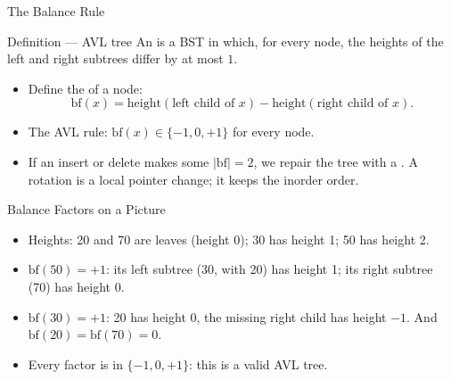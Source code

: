 \documentclass[aspectratio=169]{beamer}
\begin{document}
\begin{frame}{The Balance Rule}
  \begin{block}{Definition --- AVL tree}
    An  is a BST in which, for every node, the heights of the
    left and right subtrees differ by at most $1$.
  \end{block}
  \begin{itemize}
    \item Define the  of a node:
      \[
        \mathrm{bf}(x) = \mathrm{height}(\text{left child of }x)
                       - \mathrm{height}(\text{right child of }x).
      \]
    \item The AVL rule: $\mathrm{bf}(x) \in \{-1,0,+1\}$ for every node.
    \item If an insert or delete makes some $|\mathrm{bf}| = 2$, we repair
      the tree with a . A rotation is a local pointer change;
      it keeps the inorder order.
  \end{itemize}
\end{frame}

\begin{frame}{Balance Factors on a Picture}
  \begin{center}
  \end{center}
  \vspace{-0.1cm}
  \begin{itemize}
    \item Heights: 20 and 70 are leaves (height 0); 30 has height 1;
      50 has height 2.
    \item $\mathrm{bf}(50)=+1$: its left subtree (30, with 20) has height
      1; its right subtree (70) has height 0.
    \item $\mathrm{bf}(30)=+1$: 20 has height 0, the missing right child
      has height $-1$. And $\mathrm{bf}(20)=\mathrm{bf}(70)=0$.
    \item Every factor is in $\{-1,0,+1\}$: this is a valid AVL tree.
  \end{itemize}
\end{frame}
\end{document}
